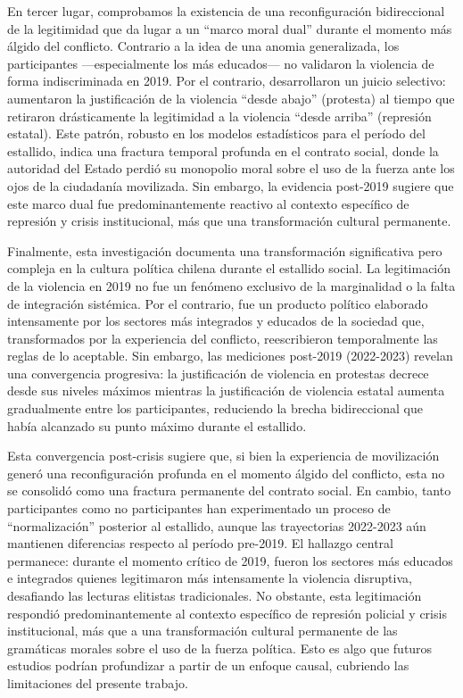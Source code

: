 \documentclass[
  13pt,
]{article}
\begin{document}
En tercer lugar, comprobamos la existencia de una reconfiguración
bidireccional de la legitimidad que da lugar a un ``marco moral dual''
durante el momento más álgido del conflicto. Contrario a la idea de una
anomia generalizada, los participantes ---especialmente los más
educados--- no validaron la violencia de forma indiscriminada en 2019.
Por el contrario, desarrollaron un juicio selectivo: aumentaron la
justificación de la violencia ``desde abajo'' (protesta) al tiempo que
retiraron drásticamente la legitimidad a la violencia ``desde arriba''
(represión estatal). Este patrón, robusto en los modelos estadísticos
para el período del estallido, indica una fractura temporal profunda en
el contrato social, donde la autoridad del Estado perdió su monopolio
moral sobre el uso de la fuerza ante los ojos de la ciudadanía
movilizada. Sin embargo, la evidencia post-2019 sugiere que este marco
dual fue predominantemente reactivo al contexto específico de represión
y crisis institucional, más que una transformación cultural permanente.

Finalmente, esta investigación documenta una transformación
significativa pero compleja en la cultura política chilena durante el
estallido social. La legitimación de la violencia en 2019 no fue un
fenómeno exclusivo de la marginalidad o la falta de integración
sistémica. Por el contrario, fue un producto político elaborado
intensamente por los sectores más integrados y educados de la sociedad
que, transformados por la experiencia del conflicto, reescribieron
temporalmente las reglas de lo aceptable. Sin embargo, las mediciones
post-2019 (2022-2023) revelan una convergencia progresiva: la
justificación de violencia en protestas decrece desde sus niveles
máximos mientras la justificación de violencia estatal aumenta
gradualmente entre los participantes, reduciendo la brecha bidireccional
que había alcanzado su punto máximo durante el estallido.

Esta convergencia post-crisis sugiere que, si bien la experiencia de
movilización generó una reconfiguración profunda en el momento álgido
del conflicto, esta no se consolidó como una fractura permanente del
contrato social. En cambio, tanto participantes como no participantes
han experimentado un proceso de ``normalización'' posterior al
estallido, aunque las trayectorias 2022-2023 aún mantienen diferencias
respecto al período pre-2019. El hallazgo central permanece: durante el
momento crítico de 2019, fueron los sectores más educados e integrados
quienes legitimaron más intensamente la violencia disruptiva, desafiando
las lecturas elitistas tradicionales. No obstante, esta legitimación
respondió predominantemente al contexto específico de represión policial
y crisis institucional, más que a una transformación cultural permanente
de las gramáticas morales sobre el uso de la fuerza política. Esto es
algo que futuros estudios podrían profundizar a partir de un enfoque
causal, cubriendo las limitaciones del presente trabajo.
\end{document}
